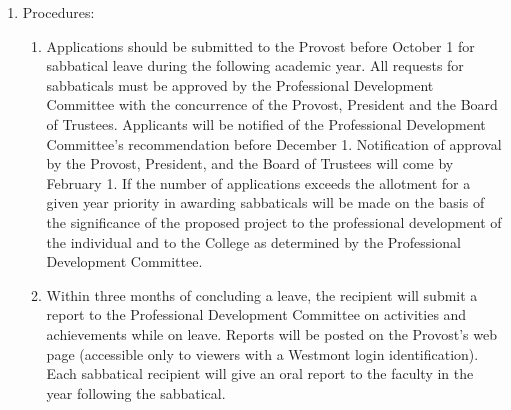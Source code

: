 \documentclass[letterpaper, 11pt]{article}
\begin{document}
\begin{enumerate}[label=\alph*)]
{\begin{enumerate}[label=\arabic*)]
							\item{Procedures:
								\begin{enumerate}[label=\arabic*)]
									\item{Applications should be submitted to the Provost before October 1 for sabbatical leave during the following academic year.  All requests for sabbaticals must be approved by the Professional Development Committee with the concurrence of the Provost, President and the Board of Trustees.  Applicants will be notified of the Professional Development Committee's recommendation before December 1.  Notification of approval by the Provost, President, and the Board of Trustees will come by February 1. If the number of applications exceeds the allotment for a given year priority in awarding sabbaticals will be made on the basis of the significance of the proposed project to the professional development of the individual and to the College as determined by the Professional Development Committee.}
									\item{Within three months of concluding a leave, the recipient will submit a report to the Professional Development Committee on activities and achievements while on leave.  Reports will be posted on the Provost's web page (accessible only to viewers with a Westmont login identification).  Each sabbatical recipient will give an oral report to the faculty in the year following the sabbatical.}
								\end{enumerate}
							}
						\end{enumerate}
					}
				\end{enumerate}
\end{document}
